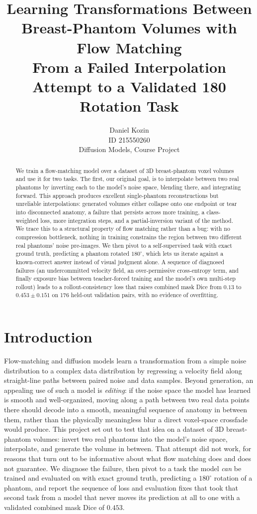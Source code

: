 \documentclass[11pt]{article}
\title{\textbf{Learning Transformations Between Breast-Phantom Volumes with Flow Matching}\\[4pt]
\large From a Failed Interpolation Attempt to a Validated 180\textdegree{} Rotation Task}
\author{Daniel Kozin \\ \small ID 215550260 \\ \small Diffusion Models, Course Project}
\date{}
\begin{document}
\maketitle
\vspace{-0.6cm}

\begin{abstract}
We train a flow-matching model over a dataset of 3D breast-phantom voxel volumes and use it
for two tasks. The first, our original goal, is to interpolate between two real phantoms by
inverting each to the model's noise space, blending there, and integrating forward. This
approach produces excellent single-phantom reconstructions but unreliable interpolations:
generated volumes either collapse onto one endpoint or tear into disconnected anatomy, a
failure that persists across more training, a class-weighted loss, more integration steps, and
a partial-inversion variant of the method. We trace this to a structural property of flow
matching rather than a bug: with no compression bottleneck, nothing in training constrains the
region between two different real phantoms' noise pre-images. We then pivot to a
self-supervised task with exact ground truth, predicting a phantom rotated $180^\circ$,
which lets us iterate against a known-correct answer instead of visual judgment alone. A
sequence of diagnosed failures (an undercommitted velocity field, an over-permissive
cross-entropy term, and finally exposure bias between teacher-forced training and the model's
own multi-step rollout) leads to a rollout-consistency loss that raises combined mask Dice from
$0.13$ to $0.453 \pm 0.151$ on 176 held-out validation pairs, with no evidence of overfitting.
\end{abstract}

\section{Introduction}
Flow-matching and diffusion models learn a transformation from a simple noise distribution to
a complex data distribution by regressing a velocity field along straight-line paths between
paired noise and data samples. Beyond generation, an appealing use of such a model is
\emph{editing}: if the noise space the model has learned is smooth and well-organized, moving
along a path between two real data points there should decode into a smooth, meaningful
sequence of anatomy in between them, rather than the physically meaningless blur a direct
voxel-space crossfade would produce. This project set out to test that idea on a dataset of 3D
breast-phantom volumes: invert two real phantoms into the model's noise space, interpolate, and
generate the volume in between. That attempt did not work, for reasons that turn out to be
informative about what flow matching does and does not guarantee. We diagnose the failure, then
pivot to a task the model \emph{can} be trained and evaluated on with exact ground truth,
predicting a $180^\circ$ rotation of a phantom, and report the sequence of loss and
evaluation fixes that took that second task from a model that never moves its prediction at all
to one with a validated combined mask Dice of $0.453$.
\end{document}
